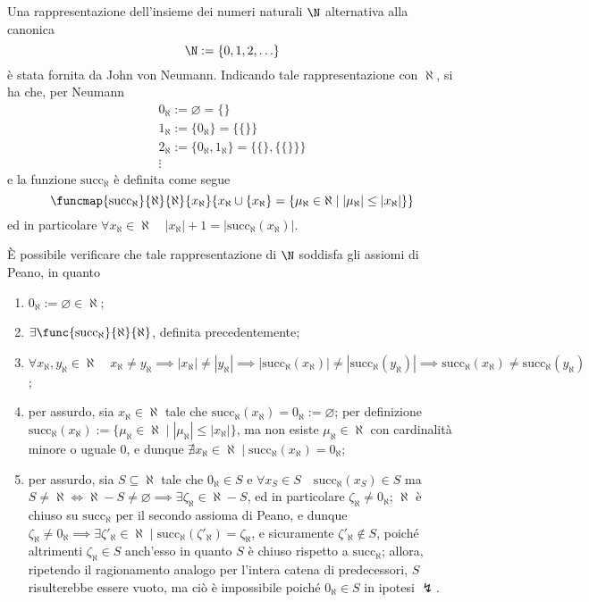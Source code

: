 \documentclass[a4paper, 12pt]{report}
\begin{document}
    \begin{example}
        Una rappresentazione dell'insieme dei numeri naturali $\N$ alternativa alla canonica $$\N := \{0, 1, 2, \ldots \}$$ è stata fornita da John von Neumann. Indicando tale rappresentazione con $\aleph$, si ha che, per Neumann $$\begin{array}{c} 0_\aleph := \varnothing  = \{\} \\ 1_\aleph := \{ 0_\aleph \} = \{ \{ \}\} \\ 2_\aleph := \{0_\aleph, 1_\aleph\} = \{\{\}, \{\{ \}\}\} \\ \vdots \end{array}$$ e la funzione $\mathrm{succ}_\aleph$ è definita come segue $$\funcmap{\mathrm{succ}_\aleph}{\aleph}{\aleph}{x_\aleph}{x_\aleph \cup \{x_\aleph\} = \{\mu_\aleph \in \aleph \mid |\mu_\aleph| \le |x_\aleph|\}}$$ ed in particolare $\forall x_\aleph \in \aleph \quad |x_\aleph| + 1 = |\mathrm{succ}_\aleph(x_\aleph)|$.

        È possibile verificare che tale rappresentazione di $\N$ soddisfa gli assiomi di Peano, in quanto

        \begin{enumerate}[label=\roman*), font=\itshape]
            \item $0_\aleph := \varnothing \in \aleph$;
            \item $\exists \func{\mathrm{succ}_\aleph}{\aleph}{\aleph}$, definita precedentemente;
            \item $\forall x_\aleph, y_\aleph \in \aleph \quad x_\aleph \neq y_\aleph \implies |x_\aleph| \neq |y_\aleph| \implies  |\mathrm{succ}_\aleph(x_\aleph)| \neq |\mathrm{succ}_\aleph(y_\aleph)| \implies \mathrm{succ}_\aleph(x_\aleph) \neq \mathrm{succ}_\aleph(y_\aleph)$;
            \item per assurdo, sia $x_\aleph \in \aleph$ tale che $\mathrm{succ}_\aleph(x_\aleph) = 0_\aleph := \varnothing$; per definizione $\mathrm{succ}_\aleph(x_\aleph) := \{\mu_\aleph \in \aleph \mid |\mu_\aleph| \le |x_\aleph|\}$, ma non esiste $\mu_\aleph \in \aleph$ con cardinalità minore o uguale 0, e dunque $\nexists x_\aleph \in \aleph \mid \mathrm{succ}_\aleph(x_\aleph) = 0_\aleph$;
            \item per assurdo, sia $S \subseteq \aleph$ tale che $0_\aleph \in S$ e $\forall x_S \in S \quad \mathrm{succ}_\aleph(x_S) \in S$ ma $S \neq \aleph \iff \aleph - S \neq \varnothing \implies \exists \zeta_\aleph \in \aleph - S$, ed in particolare $\zeta_\aleph \neq 0_\aleph$; $\aleph$ è chiuso su $\mathrm{succ}_\aleph$ per il secondo assioma di Peano, e dunque $\zeta_\aleph \neq 0_\aleph \implies \exists \zeta'_\aleph \in \aleph \mid \mathrm{succ}_\aleph(\zeta'_\aleph) = \zeta_\aleph$, e sicuramente $\zeta'_\aleph \notin S$, poiché altrimenti $\zeta_\aleph \in S$ anch'esso in quanto $S$ è chiuso rispetto a $\mathrm{succ}_\aleph$; allora, ripetendo il ragionamento analogo per l'intera catena di predecessori, $S$ risulterebbe essere vuoto, ma ciò è impossibile poiché $0_\aleph \in S$ in ipotesi $\lightning$.
        \end{enumerate}
    \end{example}
\end{document}
